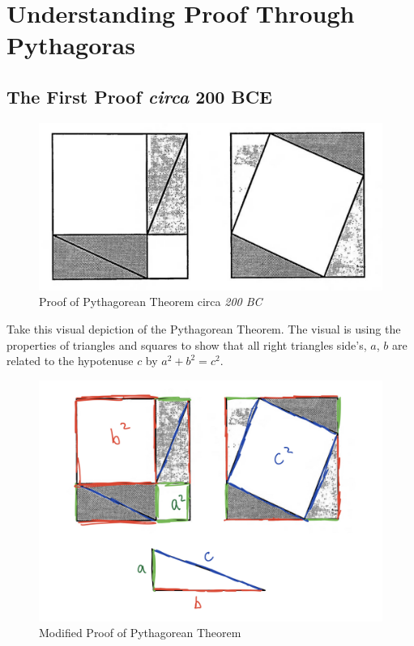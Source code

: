 \documentclass[11pt,a4paper]{article}
\begin{document}
\section{Understanding Proof Through Pythagoras}
\subsection{The First Proof \textit{circa} 200 BCE}
\begin{figure}[h]
\begin{center}
\includegraphics[scale=.20]{proof of pt} 
\caption{Proof of Pythagorean Theorem circa \textit{200 BC}}
\end{center}
\end{figure}

Take this visual depiction of the Pythagorean Theorem. The visual is using the properties of triangles and squares to show that all right triangles side's, $a$, $b$ are related to the hypotenuse $c$ by $a^2 +b^2 = c^2$.

\begin{figure}[h]
\begin{center}
\includegraphics[scale=.20]{modified proof of pt} 
\caption{Modified Proof of Pythagorean Theorem }
\end{center}
\end{figure}
\end{document}

